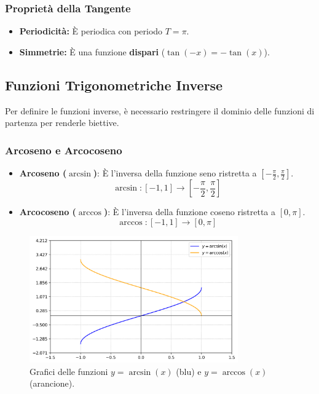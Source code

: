\documentclass[oneside,10pt]{book} %
\begin{document}
\subsubsection{Proprietà della Tangente}
\begin{itemize}
    \item \textbf{Periodicità:} È periodica con periodo \(T = \pi\).
    \item \textbf{Simmetrie:} È una funzione \textbf{dispari} (\(\tan(-x) = -\tan(x)\)).
\end{itemize}

\subsection{Funzioni Trigonometriche Inverse}
Per definire le funzioni inverse, è necessario restringere il dominio delle funzioni di partenza per renderle biettive.

\subsubsection{Arcoseno e Arcocoseno}
\begin{itemize}
    \item \textbf{Arcoseno (\(\arcsin\))}: È l'inversa della funzione seno ristretta a \(\left[-\frac{\pi}{2}, \frac{\pi}{2}\right]\).
    \[ \arcsin: [-1, 1] \rightarrow \left[-\frac{\pi}{2}, \frac{\pi}{2}\right] \]
    \item \textbf{Arcocoseno (\(\arccos\))}: È l'inversa della funzione coseno ristretta a \([0, \pi]\).
    \[ \arccos: [-1, 1] \rightarrow [0, \pi] \]
\end{itemize}

\begin{figure}[H]
    \centering
    \includegraphics[width=0.8\textwidth]{./img/arcsin_arccos_grafici.png}
    \caption{Grafici delle funzioni \(y=\arcsin(x)\) (blu) e \(y=\arccos(x)\) (arancione).}
    \label{fig:arcsin_arccos_grafici}
\end{figure}
\FloatBarrier
\end{document}
